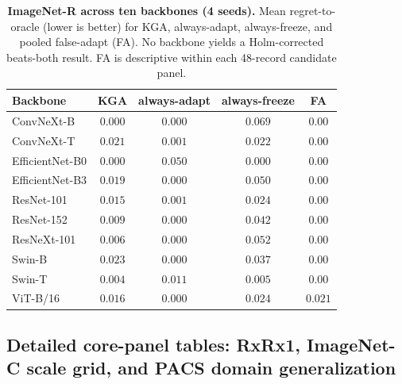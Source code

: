 \documentclass[conference]{IEEEtran}
\theoremstyle{plain}
\theoremstyle{definition}
\begin{document}
\begin{table}[t]\centering\footnotesize
\caption{\textbf{ImageNet-R across ten backbones (4 seeds).} Mean regret-to-oracle (lower is
better) for \textsc{KGA}, always-adapt, always-freeze, and pooled false-adapt (FA). No backbone
yields a Holm-corrected beats-both result. FA is descriptive within each 48-record candidate panel.}
\label{tab:imagenetr-backbones}
{%
\begin{tabular}{lcccc}
\toprule
Backbone & \textsc{KGA} & always-adapt & always-freeze & FA \\
\midrule
ConvNeXt-B      & $0.000$ & $0.000$ & $0.069$ & $0.00$ \\
ConvNeXt-T      & $0.021$ & $0.001$ & $0.022$ & $0.00$ \\
EfficientNet-B0 & $0.000$ & $0.050$ & $0.000$ & $0.00$ \\
EfficientNet-B3 & $0.019$ & $0.000$ & $0.050$ & $0.00$ \\
ResNet-101      & $0.015$ & $0.001$ & $0.024$ & $0.00$ \\
ResNet-152      & $0.009$ & $0.000$ & $0.042$ & $0.00$ \\
ResNeXt-101     & $0.006$ & $0.000$ & $0.052$ & $0.00$ \\
Swin-B          & $0.023$ & $0.000$ & $0.037$ & $0.00$ \\
Swin-T          & $0.004$ & $0.011$ & $0.005$ & $0.00$ \\
ViT-B/16        & $0.016$ & $0.000$ & $0.024$ & $0.021$ \\
\bottomrule
\end{tabular}}
\end{table}

\subsection{Detailed core-panel tables: RxRx1, ImageNet-C scale grid, and PACS domain generalization}\label{supp:core-tables}

\end{document}

